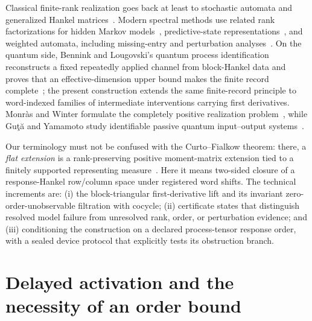 \documentclass[aps,prl,onecolumn,superscriptaddress,nofootinbib]{revtex4-2}
\begin{document}
Classical finite-rank realization goes back at least to stochastic automata and generalized Hankel matrices~\cite{CarlylePaz1971,ArbibManes1980}.  Modern spectral methods use related rank factorizations for hidden Markov models~\cite{Hsu2012HMM}, predictive-state representations~\cite{Boots2011PSR}, and weighted automata, including missing-entry and perturbation analyses~\cite{BalleMohri2012WFA,Balle2014WFA,BalleMohri2018WFA}.  On the quantum side, Bennink and Lougovski's quantum process identification reconstructs a fixed repeatedly applied channel from block-Hankel data and proves that an effective-dimension upper bound makes the finite record complete~\cite{BenninkLougovski2019QPI}; the present construction extends the same finite-record principle to word-indexed families of intermediate interventions carrying first derivatives.  Monr\`as and Winter formulate the completely positive realization problem~\cite{MonrasWinter2016}, while Gu\c{t}\u{a} and Yamamoto study identifiable passive quantum input--output systems~\cite{GutaYamamoto2016}.

Our terminology must not be confused with the Curto--Fialkow theorem: there, a \emph{flat extension} is a rank-preserving positive moment-matrix extension tied to a finitely supported representing measure~\cite{CurtoFialkow1998}.  Here it means two-sided closure of a response-Hankel row/column space under registered word shifts.  The technical increments are: (i) the block-triangular first-derivative lift and its invariant zero-order-unobservable filtration with cocycle; (ii) certificate states that distinguish resolved model failure from unresolved rank, order, or perturbation evidence; and (iii) conditioning the construction on a declared process-tensor response order, with a sealed device protocol that explicitly tests its obstruction branch.

\section{Delayed activation and the necessity of an order bound}
\label{sec:delayed}
\end{document}
